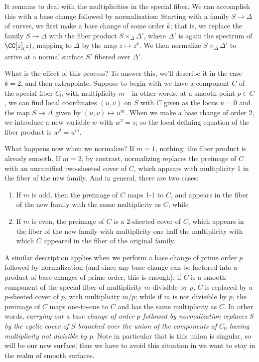 It remains to deal with the multiplicities in the special fiber. We can accomplish this with a base change followed by normalization: Starting with a family $S \to \Delta$ of curves, we first make a base change of some order $k$; that is, we replace the family $S \to \Delta$ with the fiber product $S \times_\Delta \Delta'$, where $\Delta'$ is again the spectrum of $\CC[z]_(z)$, mapping to $\Delta$ by the map $z \mapsto z^k$. We then normalize $S \times_\Delta \Delta'$ to arrive at a normal surface $S'$ fibered over $\Delta'$.

What is the effect of this process? To answer this, we'll describe it in the case $k=2$, and then extrapolate. Suppose to begin with we have a component $C$ of the special fiber $C_0$ with multiplicity $m$---in other words, at a smooth point $p \in C$, we can find local coordinates $(u,v)$ on $S$ with $C$ given as the locus $u=0$ and the map $S \to \Delta$ given by $(u,v) \mapsto u^m$. When we make a base change of order 2, we introduce a new variable $w$ with $w^2 = z$; so the local defining equation of the fiber product is $w^2 = u^m$.

What happens now when we normalize? If $m = 1$, nothing; the fiber product is already smooth. If $m=2$, by contrast, normalizing replaces the preimage of $C$ with an unramified two-sheeted cover of $C$, which appears with multiplicity 1 in the fiber of the new family. And in general, there are two cases:
\begin{enumerate}
\item If $m$ is odd, then the preimage of $C$ maps 1-1 to $C$, and appears in the fiber of the new family with the same multiplicity as $C$; while
\item If $m$ is even, the preimage of $C$ is a 2-sheeted cover of $C$, which appears in the fiber of the new family with multiplicity one half the multiplicity with which $C$ appeared in the fiber of the original family.
\end{enumerate}

A similar description applies when we perform a base change of prime order $p$ followed by normalization (and since any base change can be factored into a product of base changes of prime order, this is enough): if $C$ is a smooth component of the special fiber of multiplicity $m$ divisible by $p$, $C$ is replaced by a $p$-sheeted cover of $p$, with multiplicity $m/p$; while if $m$ is not divisible by $p$, the preimage of $C$ maps one-to-one to $C$ and has the same multiplicity as $C$. In other words, \emph{carrying out a base change of order $p$ followed by normalization replaces $S$ by the cyclic cover of $S$ branched over the union of the components of $C_0$ having multiplicity not divisible by $p$}. Note in particular that is this union is singular, so will be our new surface; thus we have to avoid this situation in we want to stay in the realm of smooth surfaces.

